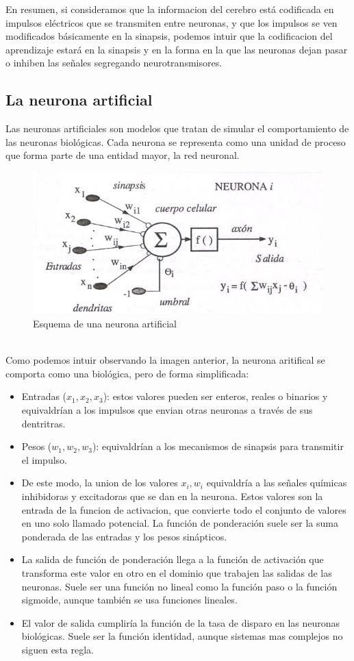 En resumen, si consideramos que la informacion del cerebro está codificada en impulsos eléctricos que se transmiten entre neuronas, y que los impulsos se ven modificados básicamente en la sinapsis, podemos intuir que la codificacion del aprendizaje estará en la sinapsis y en la forma en la que las neuronas dejan pasar o inhiben las señales segregando neurotransmisores.

\subsection {La neurona artificial} \mbox{}
Las neuronas artificiales son modelos que tratan de simular el comportamiento de las neuronas biológicas. Cada neurona se representa como una unidad de proceso que forma parte de una entidad mayor, la red neuronal.
\begin{figure}[htp]
\centering
\includegraphics[scale=1]{images/neuronaartificial.jpg}
\caption{Esquema de una neurona artificial}
\end{figure}\\
Como podemos intuir observando la imagen anterior, la neurona aritifical se comporta como una biológica, pero de forma simplificada:
\begin{itemize}
\item Entradas (${x_{1}, x_{2}, x_{3}}$): estos valores pueden ser enteros, reales o binarios y equivaldrían a los impulsos que envian otras neuronas a través de sus dentritras.
\item Pesos (${w_{1}, w_{2}, w_{3}}$): equivaldrían a los mecanismos de sinapsis para transmitir el impulso. 
\item De este modo, la union de los valores ${x_{i} , w_{i}}$ equivaldría a las señales químicas inhibidoras y excitadoras que se dan en la neurona. Estos valores son la entrada de la funcion de activacion, que convierte todo el conjunto de valores en uno solo llamado potencial. La función de ponderación suele ser la suma ponderada de las entradas y los pesos sinápticos.
\item La salida de función de ponderación llega a la función de activación que transforma este valor en otro en el dominio que trabajen las salidas de las neuronas. Suele ser una función no lineal como la función paso o la función sigmoide, aunque también se usa funciones lineales.
\item El valor de salida cumpliría la función de la tasa de disparo en las neuronas biológicas. Suele ser la función identidad, aunque sistemas mas complejos no siguen esta regla.
\end{itemize}
